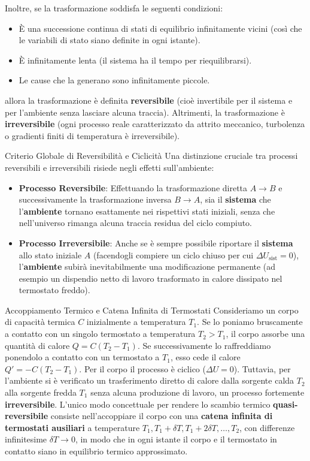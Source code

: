 Inoltre, se la trasformazione soddisfa le seguenti condizioni:
\begin{itemize}
    \item È una successione continua di stati di equilibrio infinitamente vicini (così che le variabili di stato siano definite in ogni istante).
    \item È infinitamente lenta (il sistema ha il tempo per riequilibrarsi).
    \item Le cause che la generano sono infinitamente piccole.
\end{itemize}
allora la trasformazione è definita \textbf{reversibile} (cioè invertibile per il sistema e per l'ambiente senza lasciare alcuna traccia). Altrimenti, la trasformazione è \textbf{irreversibile} (ogni processo reale caratterizzato da attrito meccanico, turbolenza o gradienti finiti di temperatura è irreversibile).

\begin{osservazione}{Criterio Globale di Reversibilità e Ciclicità}
Una distinzione cruciale tra processi reversibili e irreversibili risiede negli effetti sull'ambiente:
\begin{itemize}
    \item \textbf{Processo Reversibile}: Effettuando la trasformazione diretta $A \to B$ e successivamente la trasformazione inversa $B \to A$, sia il \textbf{sistema} che l'\textbf{ambiente} tornano esattamente nei rispettivi stati iniziali, senza che nell'universo rimanga alcuna traccia residua del ciclo compiuto.
    \item \textbf{Processo Irreversibile}: Anche se è sempre possibile riportare il \textbf{sistema} allo stato iniziale $A$ (facendogli compiere un ciclo chiuso per cui $\Delta U_{\text{sist}} = 0$), l'\textbf{ambiente} subirà inevitabilmente una modificazione permanente (ad esempio un dispendio netto di lavoro trasformato in calore dissipato nel termostato freddo).
\end{itemize}
\end{osservazione}

\begin{osservazione}{Accoppiamento Termico e Catena Infinita di Termostati}
Consideriamo un corpo di capacità termica $C$ inizialmente a temperatura $T_1$. Se lo poniamo bruscamente a contatto con un singolo termostato a temperatura $T_2 > T_1$, il corpo assorbe una quantità di calore $Q = C(T_2 - T_1)$. Se successivamente lo raffreddiamo ponendolo a contatto con un termostato a $T_1$, esso cede il calore $Q' = -C(T_2 - T_1)$. 
Per il corpo il processo è ciclico ($\Delta U = 0$). Tuttavia, per l'ambiente si è verificato un trasferimento diretto di calore dalla sorgente calda $T_2$ alla sorgente fredda $T_1$ senza alcuna produzione di lavoro, un processo fortemente \textbf{irreversibile}.
L'unico modo concettuale per rendere lo scambio termico \textbf{quasi-reversibile} consiste nell'accoppiare il corpo con una \textbf{catena infinita di termostati ausiliari} a temperature $T_1, T_1+\delta T, T_1+2\delta T, \dots, T_2$, con differenze infinitesime $\delta T \to 0$, in modo che in ogni istante il corpo e il termostato in contatto siano in equilibrio termico approssimato.
\end{osservazione}

